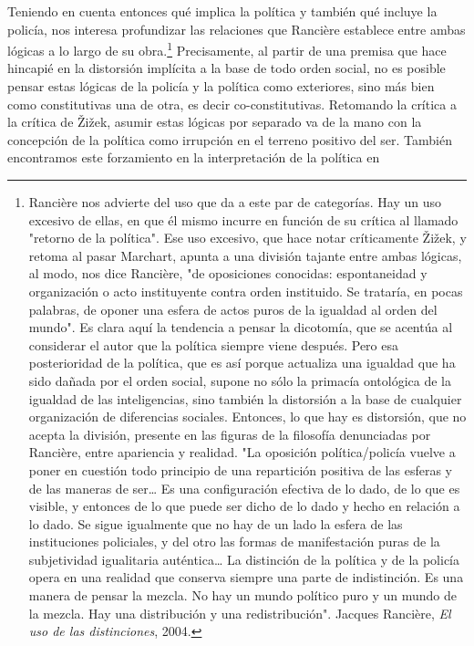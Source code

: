 \documentclass{book}
\begin{document}
Teniendo en cuenta entonces qué implica la política y también qué
incluye la policía, nos interesa profundizar las relaciones que Rancière
establece entre ambas lógicas a lo largo de su obra.\footnote{Rancière
  nos advierte del uso que da a este par de categorías. Hay un uso
  excesivo de ellas, en que él mismo incurre en función de su crítica al
  llamado "retorno de la política". Ese uso excesivo, que hace notar
  críticamente Žižek, y retoma al pasar Marchart, apunta a una división
  tajante entre ambas lógicas, al modo, nos dice Rancière, "de
  oposiciones conocidas: espontaneidad y organización o acto
  instituyente contra orden instituido. Se trataría, en pocas palabras,
  de oponer una esfera de actos puros de la igualdad al orden del
  mundo". Es clara aquí la tendencia a pensar la dicotomía, que se
  acentúa al considerar el autor que la política siempre viene después.
  Pero esa posterioridad de la política, que es así porque actualiza una
  igualdad que ha sido dañada por el orden social, supone no sólo la
  primacía ontológica de la igualdad de las inteligencias, sino también
  la distorsión a la base de cualquier organización de diferencias
  sociales. Entonces, lo que hay es distorsión, que no acepta la
  división, presente en las figuras de la filosofía denunciadas por
  Rancière, entre apariencia y realidad. "La oposición política/policía
  vuelve a poner en cuestión todo principio de una repartición positiva
  de las esferas y de las maneras de ser\ldots{} Es una configuración
  efectiva de lo dado, de lo que es visible, y entonces de lo que puede
  ser dicho de lo dado y hecho en relación a lo dado. Se sigue
  igualmente que no hay de un lado la esfera de las instituciones
  policiales, y del otro las formas de manifestación puras de la
  subjetividad igualitaria auténtica\ldots{} La distinción de la
  política y de la policía opera en una realidad que conserva siempre
  una parte de indistinción. Es una manera de pensar la mezcla. No hay
  un mundo político puro y un mundo de la mezcla. Hay una distribución y
  una redistribución". Jacques Rancière, \emph{El uso de las
  distinciones}, 2004.} Precisamente, al partir de una premisa que hace
hincapié en la distorsión implícita a la base de todo orden social, no
es posible pensar estas lógicas de la policía y la política como
exteriores, sino más bien como constitutivas una de otra, es decir
co-constitutivas. Retomando la crítica a la crítica de Žižek, asumir
estas lógicas por separado va de la mano con la concepción de la
política como irrupción en el terreno positivo del ser. También
encontramos este forzamiento en la interpretación de la política en
\end{document}
